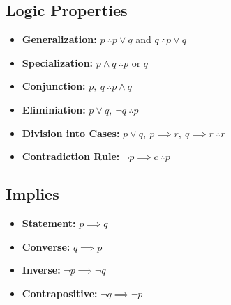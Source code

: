 \documentclass[landscape, letterpaper, 8pt]{extarticle}
\begin{document}
\begin{multicols}{3}
    \section*{Logic Properties}
    \begin{itemize}[noitemsep,nolistsep]
        \item \textbf{Generalization: } $p~\therefore p \lor q$ and $q~\therefore p \lor q$
        \item \textbf{Specialization: } $p \land q~\therefore p$ or $q$
        \item \textbf{Conjunction: } $p,~q~\therefore p \land q$
        \item \textbf{Eliminiation: } $p \lor q,~\neg q~\therefore p$
        \item \textbf{Division into Cases: } $p \lor q,~p\implies r,~q\implies r~\therefore r$
        \item \textbf{Contradiction Rule: } $\neg p \implies c~\therefore p$
    \end{itemize}
    \subsection*{Implies}
    \begin{itemize}[noitemsep,nolistsep]
        \item \textbf{Statement: } $p \implies q$
        \item \textbf{Converse: } $q \implies p$
        \item \textbf{Inverse: } $\neg p \implies \neg q$
        \item \textbf{Contrapositive: } $\neg q \implies \neg p$
    \end{itemize}

\end{multicols}
\end{document}
